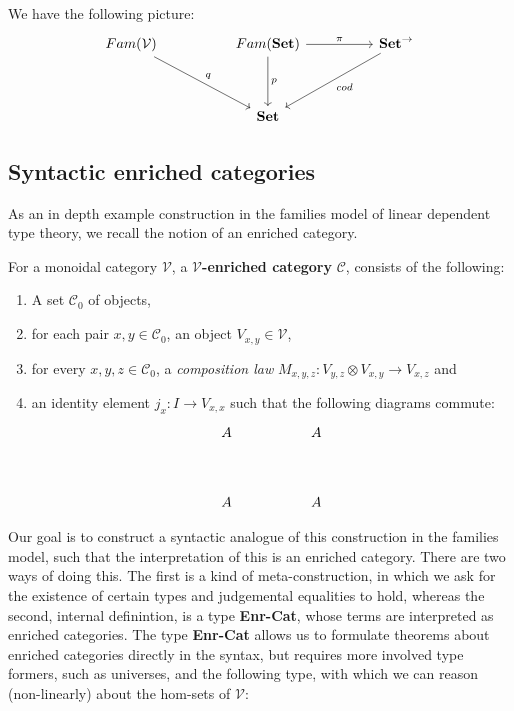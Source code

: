 We have the following picture:
\[
\ti
Fam(\mathcal{V}) \ar[rd, "q"]  & Fam(\mathbf{Set}) \ar[d, "p"] \ar[r, "\pi"] & \mathbf{Set}^\to \ar[ld, "cod"] \\
& \mathbf{Set}
\kz
\]

\subsection{Syntactic enriched categories}
As an in depth example construction in the families model of linear dependent type theory, we recall the notion of an enriched category.
\begin{defn}
  For a monoidal category $\mathcal{V}$, a \textbf{$\mathcal{V}$-enriched category} $\mathcal{C}$, consists of the following:
  \begin{enumerate}
  \item A set $\mathcal{C}_0$ of objects,
  \item for each pair $x, y \in \mathcal{C}_0$, an object $V_{x,y} \in \mathcal{V}$,
  \item for every $x, y, z \in \mathcal{C}_0$, a \textit{composition law} $M_{x, y, z} : V_{y, z} \otimes V_{x, y} \to V_{x, z}$ and
    \item an identity element $j_x : I \to V_{x, x}$
    such that the following diagrams commute:
    \[
      \ti
      A & A \\
      A & A
      \kz
    \]
  \end{enumerate}
\end{defn}
Our goal is to construct a syntactic analogue of this construction in the families model, such that the interpretation of this is an enriched category. There are two ways of doing this. The first is a kind of meta-construction, in which we ask for the existence of certain types and judgemental equalities to hold, whereas the second, internal definintion, is a type \textbf{Enr-Cat}, whose terms are interpreted as enriched categories. The type \textbf{Enr-Cat} allows us to formulate theorems about enriched categories directly in the syntax, but requires more involved type formers, such as universes, and the following type,
with which we can reason (non-linearly) about the hom-sets of $\mathcal{V}$:\\
